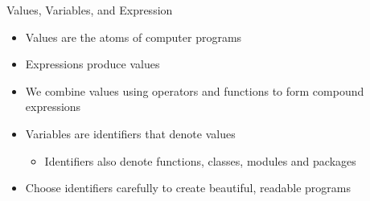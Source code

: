 \documentclass[smaller, aspectratio=1610]{beamer}
\begin{document}
\begin{frame}[label={sec:orgd93c250}]{Values, Variables, and Expression}
\begin{itemize}
\item Values are the atoms of computer programs
\item Expressions produce values
\item We combine values using operators and functions to form compound expressions
\item Variables are identifiers that denote values
\begin{itemize}
\item Identifiers also denote functions, classes, modules and packages
\end{itemize}
\item Choose identifiers carefully to create beautiful, readable programs
\end{itemize}
\end{frame}
\end{document}
